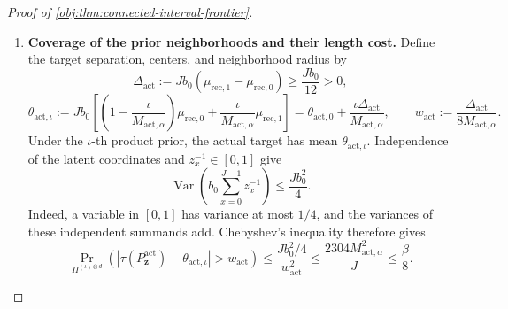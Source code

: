 \begin{proof}[Proof of \cref{obj:thm:connected-interval-frontier}]
\begin{enumerate}
To bound this last probability, define
\[
K_{\mathrm{tail}}:=K+1,\qquad
\lambda_{\mathrm{act}}:=nb_0qH=\frac{\eta K^2}{\ell}.
\]
The membership and activation pattern has a common law under all the
priors, and each \(V_x\) has distribution
\(\operatorname{Binomial}(n,b_0qH)\). Counting subsets of
\(K_{\mathrm{tail}}\) successful observations gives
\[
E\binom{V_x}{K_{\mathrm{tail}}}
=
\binom{n}{K_{\mathrm{tail}}}(b_0qH)^{K_{\mathrm{tail}}},
\]
with both sides zero when \(K_{\mathrm{tail}}>n\). Since
\(\mathbf1\{V_x>K\}\le\binom{V_x}{K_{\mathrm{tail}}}\),
\[
\Pr(V_x>K)
\le\frac{\lambda_{\mathrm{act}}^{K_{\mathrm{tail}}}}
         {K_{\mathrm{tail}}!}.
\]
The ceiling inequalities imply
\[
\lambda_{\mathrm{act}}
=\frac{\eta K^2}{\ell}
\le2\eta K_{\mathrm{tail}}
\le e^{-31}K_{\mathrm{tail}},
\qquad
K_{\mathrm{tail}}\ge\ell.
\]
Using the \(K_{\mathrm{tail}}\)-th term of the exponential series,
\[
\frac{\lambda_{\mathrm{act}}^{K_{\mathrm{tail}}}}
     {K_{\mathrm{tail}}!}
\le
e^{-31K_{\mathrm{tail}}}
\frac{K_{\mathrm{tail}}^{K_{\mathrm{tail}}}}
     {K_{\mathrm{tail}}!}
\le e^{-30K_{\mathrm{tail}}}
\le e^{-30\ell}.
\]
A union bound, followed by the mass cap and
\(N\le e^\ell\), \(\ell\le e^\ell\), now gives
\[
\widetilde{\mathbb Q}_{\mathrm{act},0}(G_{\mathrm{act}}^c)
\le Je^{-30\ell}
\le \frac{N\ell}{2e^{-32}}e^{-30\ell}
\le e^{32-28\ell}.
\]
Finally, the definition of \(T_{\mathrm{act},\alpha}\) implies
\[
\ell\ge\frac{32-\log(\beta/16)}{28},
\qquad
e^{32-28\ell}\le\frac\beta{16}.
\]
Thus, for every grid index,
\[
\operatorname{TV}
\bigl(\mathbb Q_{\mathrm{act},0},
      \mathbb Q_{\mathrm{act},\iota}\bigr)
\le\frac\beta{16}.
\]

\item \textbf{Coverage of the prior neighborhoods and their length cost.}
Define the target separation, centers, and neighborhood radius by
\[
\Delta_{\mathrm{act}}
:=Jb_0(\mu_{\mathrm{rec},1}-\mu_{\mathrm{rec},0})
\ge\frac{Jb_0}{12}>0,
\]
\[
\theta_{\mathrm{act},\iota}
:=
Jb_0\left[
\left(1-\frac{\iota}{M_{\mathrm{act},\alpha}}\right)
\mu_{\mathrm{rec},0}
+\frac{\iota}{M_{\mathrm{act},\alpha}}\mu_{\mathrm{rec},1}
\right]
=
\theta_{\mathrm{act},0}
+\frac{\iota\Delta_{\mathrm{act}}}{M_{\mathrm{act},\alpha}},
\qquad
w_{\mathrm{act}}
:=\frac{\Delta_{\mathrm{act}}}{8M_{\mathrm{act},\alpha}}.
\]
Under the \(\iota\)-th product prior, the actual target has mean
\(\theta_{\mathrm{act},\iota}\). Independence of the latent coordinates
and \(z_x^{-1}\in[0,1]\) give
\[
\operatorname{Var}\!\left(
b_0\sum_{x=0}^{J-1}z_x^{-1}
\right)\le\frac{Jb_0^2}{4}.
\]
Indeed, a variable in \([0,1]\) has variance at most \(1/4\), and the
variances of these independent summands add. Chebyshev's inequality
therefore gives
\[
\Pr_{\Pi^{(\iota)\otimes d}}\!\left(
\left|\tau(P^{\mathrm{act}}_{\mathbf z})
-\theta_{\mathrm{act},\iota}\right|>w_{\mathrm{act}}
\right)
\le
\frac{Jb_0^2/4}{w_{\mathrm{act}}^2}
\le
\frac{2304M_{\mathrm{act},\alpha}^2}{J}
\le\frac\beta8.
\]


\end{enumerate}
\end{proof}
